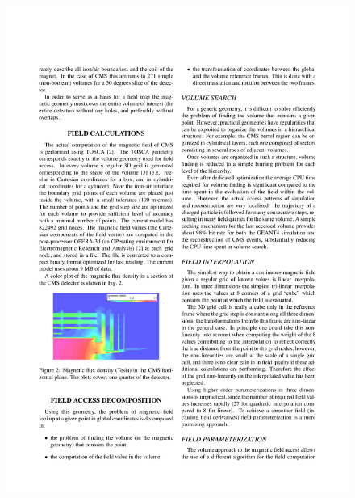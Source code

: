 \begin{figure}[hbtp]
  \begin{center}
    \includegraphics[width=1.24\cmsFigWidth]{figures/cms-magneticfield}

\end{center}
\end{figure}
